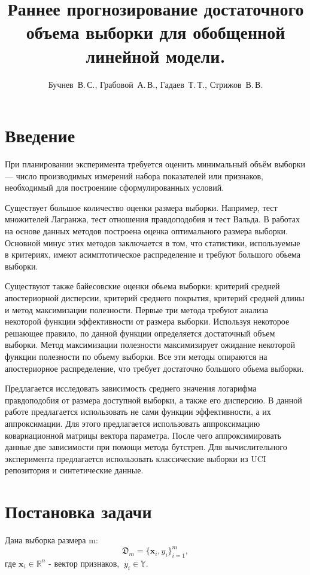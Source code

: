 \documentclass[12pt,twoside]{article}
\title
    {Раннее прогнозирование достаточного объема выборки для обобщенной линейной модели.}
\author
    {Бучнев~В.\,С., Грабовой~А.\,В., Гадаев~Т.\,Т., Стрижов~В.\,В.} %
\begin{document}
\maketitle

\section{Введение}
При планировании эксперимента требуется оценить минимальный объём выборки — число производимых измерений набора показателей или признаков, необходимый для построениие сформулированных условий. 

Существует большое количество оценки размера выборки. Например, тест множителей Лагранжа, тест отношения правдоподобия и тест Вальда. В работах \cite{Self-Mauritsen-1998, Shieh-2000, Shieh-2005} на основе данных методов построена оценка оптимального размера выборки. Основной минус этих методов заключается в том, что статистики, используемые в критериях, имеют асимптотическое распределение и требуют большого обьема выборки.

Существуют также байесовские оценки обьема выборки: критерий средней апостериорной дисперсии, критерий среднего покрытия, критерий средней длины и метод максимизации полезности. Первые три метода требуют анализа некоторой функции эффективности от размера выборки. Используя некоторое решающее правило, по данной функции определяется достаточный объем выборки. Метод максимизации полезности максимизирует ожидание некоторой функции полезности по обьему выборки. Все эти методы опираются на апостериорное распределение, что требует достаточно большого обьема выборки.

Предлагается исследовать зависимость среднего значения логарифма правдоподобия от размера доступной выборки, а также его дисперсию. В данной работе предлагается использовать не сами функции эффективности, а их аппроксимации. Для этого предлагается использовать аппроксимацию ковариационной матрицы вектора параметра. После чего аппроксимировать данные две зависимости при помощи метода бутстреп. Для вычислительного эксперимента предлагается использовать классические выборки из UCI репозитория и синтетические данные.

\section{Постановка задачи}

Дана выборка размера m:
$$
\mathfrak D_m = \{\textbf{x}_i, y_i\}_{i=1}^m,
$$
где $\textbf{x}_i \in \mathbb{R}^{n}$ - вектор признаков, $~y_i \in \mathbb{Y}$.
\end{document}
